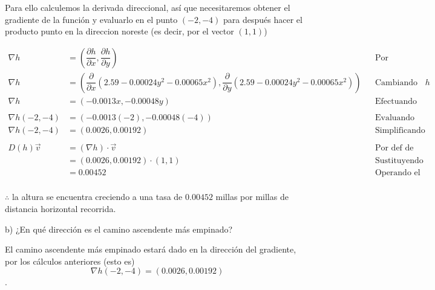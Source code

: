 \documentclass[letterpaper]{article}
\renewcommand{\d}{\partial}
\renewcommand{\*}{\cdot}
\theoremstyle{definition}
\begin{document}
Para ello calculemos la derivada direccional, así que necesitaremos obtener el gradiente de la función y evaluarlo en el punto $ (-2,-4) $ para después hacer el producto punto en la direccion noreste (es decir, por el vector $ (1,1) $)

\begin{align*}
	\nabla h &= \left(\dfrac{\d h}{\d x}, \dfrac{\d h}{\d y}\right) &&\text{Por definición de gradiente}\\
	\nabla h &= \left(\dfrac{\d }{\d x}(2.59 - 0.00024y^2 - 0.00065x^2), \dfrac{\d}{\d y}(2.59 - 0.00024y^2 - 0.00065x^2)\right) &&\text{Cambiando por la definición de }h\\
	\nabla h &= \left(-0.0013x, -0.00048y\right) &&\text{Efectuando las parciales}\\
	\\
	\nabla h(-2,-4) &= \left(-0.0013(-2), -0.00048(-4)\right) &&\text{Evaluando en el punto en cuestión}\\
	\nabla h(-2,-4) &= (0.0026, 0.00192) &&\text{Simplificando}\\
	\\
	D(h) \vec{v} &= (\nabla h)\* \vec{v} &&\text{Por def de derivada direccional}\\
	 &= (0.0026, 0.00192)\* (1,1) &&\text{Sustituyendo el vector en cuestión}\\
	 &=0.00452&&\text{Operando el producto punto}\\
\end{align*}
\begin{center}
	$ \therefore $ la altura se encuentra creciendo a una tasa de $ 0.00452 $ millas por millas de distancia horizontal recorrida.
\end{center}

b) ¿En qué dirección es el camino ascendente más empinado?

El camino ascendente más empinado estará dado en la dirección del gradiente, por los cálculos anteriores (esto es) $$\nabla h(-2,-4)= (0.0026,0.00192) $$.
\end{document}
